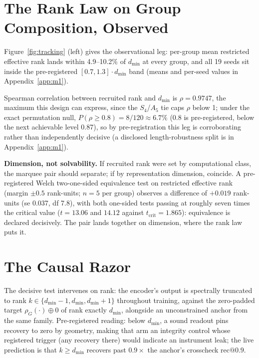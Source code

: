 \documentclass[mlabstract,onecolumn]{jmlr}
\makeatletter
\newcommand{\dmin}{d_{\min}}
\newcommand{\recninety}{\mathrm{rec}@0.9}
\makeatother
\begin{document}
\section{The Rank Law on Group Composition, Observed}
\label{sec:observed}

Figure~\ref{fig:tracking} (left) gives the observational leg: per-group mean
restricted effective rank lands within 4.9--10.2\% of $\dmin$ at every group,
and all 19 seeds sit inside the pre-registered $[0.7, 1.3] \cdot \dmin$
band (means and per-seed values in Appendix~\ref{app:m1}).

Spearman correlation between recruited rank and $\dmin$ is
$\rho = 0.9747$,
the maximum this design can express, since the $S_4$/$A_5$ tie caps
$\rho$ below 1; under the exact permutation null,
$P(\rho \geq 0.8) = 8/120 \approx 6.7\%$ (0.8 is pre-registered, below the
next achievable level 0.87),
so by pre-registration this leg is corroborating rather than independently
decisive (a disclosed length-robustness split is in
Appendix~\ref{app:m1}).

\textbf{Dimension, not solvability.} If recruited rank were set by
computational class, the marquee pair should separate; if by
representation dimension, coincide. A pre-registered Welch two-one-sided
equivalence test on restricted effective rank (margin $\pm 0.5$
rank-units; $n = 5$ per group) observes a difference of
$+0.019$ rank-units (se 0.037, df 7.8), with both one-sided tests passing
at roughly seven times the critical value ($t = 13.06$ and $14.12$
against $t_{\mathrm{crit}} = 1.865$): equivalence is declared decisively.
The pair lands together on dimension, where the rank law puts it.

\section{The Causal Razor}
\label{sec:razor}

The decisive test intervenes on rank: the encoder's output is
spectrally truncated to rank $k \in \{\dmin{-}1, \dmin, \dmin{+}1\}$
throughout training, against the zero-padded target
$\rho_G(\cdot) \oplus 0$ of rank exactly $\dmin$, alongside an
unconstrained anchor from the same family. Pre-registered reading:
below $\dmin$, a sound readout pins recovery to zero by geometry,
making that arm an integrity control whose registered trigger (any
recovery there) would indicate an instrument leak; the live prediction
is that $k \geq \dmin$ recovers past $0.9\times$ the anchor's
crosscheck $\recninety$.
\end{document}
